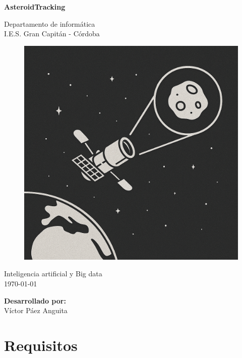 \documentclass[12pt]{article}
\begin{document}
\begin{titlepage}
    \begin{center}
      \Large \bfseries{}
    \end{center}
    \vspace{0.1cm}
    \begin{center}
      \Large \bfseries{}
    \end{center}
    \vspace{0.1cm}
    \begin{center}
     \Large \bfseries{AsteroidTracking}
    \end{center}
    \vspace{0.0001cm}
    \begin{center}
        Departamento de informática \\ I.E.S. Gran Capitán - Córdoba
    \end{center}
        \vspace{2 cm}
\begin{figure}[h!]
    \centering
    \includegraphics[width=.5\textwidth]{assets/portada.png}
    \label{fig:my_label}
\end{figure}
    \vspace{0.2 cm}
    \begin{center}
        Inteligencia artificial y Big data \\ \today 
    \end{center}
    \vspace{4 cm}
\null\hfill \textbf{Desarrollado por:}
\\
\null\hfill Víctor Páez Anguita
\clearpage
\end{titlepage}

\tableofcontents
\clearpage


\section{Requisitos}
\end{document}
